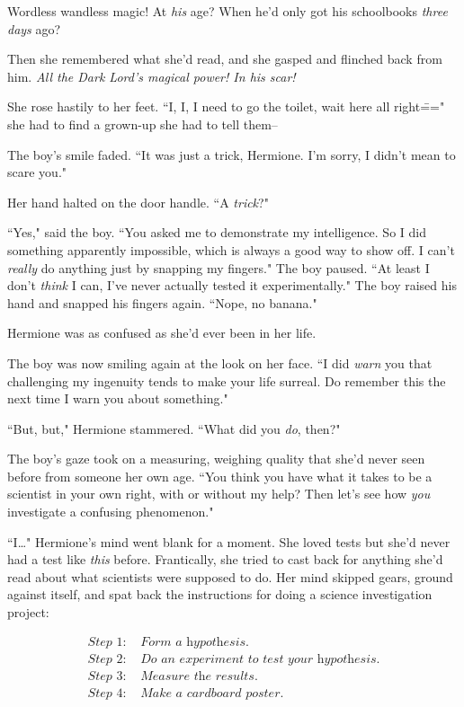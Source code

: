 Wordless wandless magic! At \emph{his} age? When he'd only got his schoolbooks \emph{three days} ago?

Then she remembered what she'd read, and she gasped and flinched back from him. \emph{All the Dark Lord's magical power! In his scar!}

She rose hastily to her feet. ``I, I, I need to go the toilet, wait here all right\===" she had to find a grown-up she had to tell them\---

The boy's smile faded. ``It was just a trick, Hermione. I'm sorry, I didn't mean to scare you."

Her hand halted on the door handle. ``A \emph{trick}?"

``Yes," said the boy. ``You asked me to demonstrate my intelligence. So I did something apparently impossible, which is always a good way to show off. I can't \emph{really} do anything just by snapping my fingers." The boy paused. ``At least I don't \emph{think} I can, I've never actually tested it experimentally." The boy raised his hand and snapped his fingers again. ``Nope, no banana."

Hermione was as confused as she'd ever been in her life.

The boy was now smiling again at the look on her face. ``I did \emph{warn} you that challenging my ingenuity tends to make your life surreal. Do remember this the next time I warn you about something."

``But, but," Hermione stammered. ``What did you \emph{do}, then?"

The boy's gaze took on a measuring, weighing quality that she'd never seen before from someone her own age. ``You think you have what it takes to be a scientist in your own right, with or without my help? Then let's see how \emph{you} investigate a confusing phenomenon."

``I{\ldots}" Hermione's mind went blank for a moment. She loved tests but she'd never had a test like \emph{this} before. Frantically, she tried to cast back for anything she'd read about what scientists were supposed to do. Her mind skipped gears, ground against itself, and spat back the instructions for doing a science investigation project:

\vspace*{-1\baselineskip}%
\begin{align*}
\textit{Step 1:}&\textit{ Form a hypothesis.}\\
\textit{Step 2:}&\textit{ Do an experiment to test your hypothesis.}\\
\textit{Step 3:}&\textit{ Measure the results.}\\
\textit{Step 4:}&\textit{ Make a cardboard poster.}
\end{align*}

